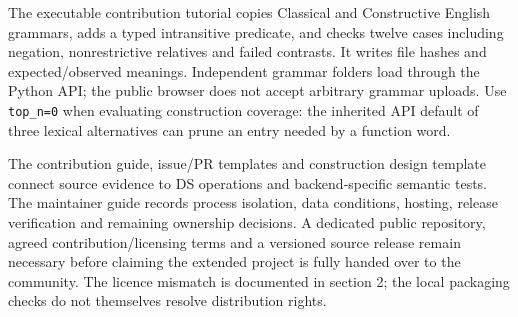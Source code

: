 \documentclass[11pt,a4paper]{article}
\begin{document}
The executable contribution tutorial copies Classical and Constructive
English grammars, adds a typed intransitive predicate, and checks twelve
cases including negation, nonrestrictive relatives and failed contrasts.
It writes file hashes and expected/observed meanings. Independent
grammar folders load through the Python API; the public browser does not
accept arbitrary grammar uploads. Use \texttt{top\_n=0} when evaluating
construction coverage: the inherited API default of three lexical
alternatives can prune an entry needed by a function word.

The contribution guide, issue/PR templates and construction design
template connect source evidence to DS operations and backend-specific
semantic tests. The maintainer guide records process isolation, data
conditions, hosting, release verification and remaining ownership
decisions. A dedicated public repository, agreed contribution/licensing
terms and a versioned source release remain necessary before claiming
the extended project is fully handed over to the community. The licence
mismatch is documented in section 2; the local packaging checks do not
themselves resolve distribution rights.
\end{document}
